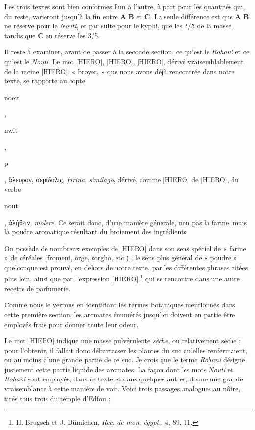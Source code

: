 \documentclass[a4paper, 11pt, oneside]{article}
\begin{document}
Les trois textes sont bien conformes l'un à l'autre, à part pour les quantités qui, du reste, varieront jusqu'à la fin entre \textbf{A} \textbf{B} et \textbf{C}. La seule différence est que \textbf{A} \textbf{B} ne réserve pour le \emph{Nouti}, et par suite pour le kyphi, que les 2/5 de la masse, tandis que \textbf{C} en réserve les 3/5.

Il reste à examiner, avant de passer à la seconde section, ce qu'est le \emph{Rohani} et ce qu'est le \emph{Nouti}. Le mot [HIERO], [HIERO], [HIERO], dérivé vraisemblablement de la racine [HIERO], « broyer, » que nous avons déjà rencontrée dans notre texte, se rapporte au copte \begin{coptic}noeit\end{coptic}, \begin{coptic}nwit\end{coptic}, \begin{coptic}p\end{coptic}, ἄλευρον, σεμίδαλις, \emph{farina}, \emph{similago}, dérivé, comme [HIERO] de [HIERO], du verbe \begin{coptic}nout\end{coptic}, ἀλήθειν, \emph{molere}. Ce serait donc, d'une manière générale, non pas la farine, mais la poudre aromatique résultant du broiement des ingrédients.

On possède de nombreux exemples de [HIERO] dans son sens spécial de « farine » de céréales (froment, orge, sorgho, etc.) ; le sens plus général de « poudre » quelconque est prouvé, en dehors de notre texte, par les différentes phrases citées plus loin, ainsi que par l'expression [HIERO],\footnote{H. Brugsch et J. Dümichen, \emph{Rec. de mon. égypt.}, 4, 89, 11.} qui se rencontre dans une autre recette de parfumerie.

Comme nous le verrons en identifiant les termes botaniques mentionnés dans cette première section, les aromates énumérés jusqu'ici doivent en partie être employés frais pour donner toute leur odeur.

Le mot [HIERO] indique une masse pulvérulente \emph{sèche}, ou relativement sèche ; pour l'obtenir, il fallait donc débarrasser les plantes du suc qu'elles renfermaient, ou au moins d'une grande partie de ce suc. Je crois que le terme \emph{Rohani} désigne justement cette partie liquide des aromates. La façon dont les mots \emph{Nouti} et \emph{Rohani} sont employés, dans ce texte et dans quelques autres, donne une grande vraisemblance à cette manière de voir. Voici trois passages analogues au nôtre, tirés tous trois du temple d'Edfou :
\end{document}
